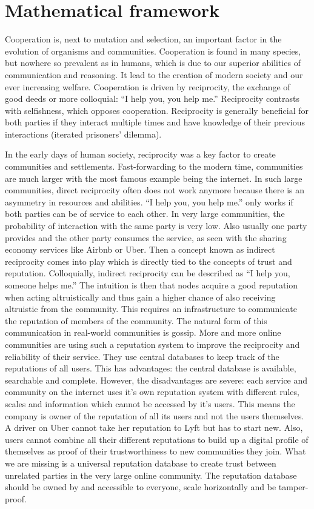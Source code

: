 \chapter{Mathematical framework}
Cooperation is, next to mutation and selection, an important factor in the evolution of organisms and communities. Cooperation is found in many species, but nowhere so prevalent as in humans, which is due to our superior abilities of communication and reasoning. It lead to the creation of modern society and our ever increasing welfare. Cooperation is driven by reciprocity, the exchange of good deeds or more colloquial: “I help you, you help me.” Reciprocity contrasts with selfishness, which opposes cooperation. Reciprocity is generally beneficial for both parties if they interact multiple times and have knowledge of their previous interactions (iterated prisoners’ dilemma). 


In the early days of human society, reciprocity was a key factor to create communities and settlements. Fast-forwarding to the modern time, communities are much larger with the most famous example being the internet. In such large communities, direct reciprocity often does not work anymore because there is an asymmetry in resources and abilities. “I help you, you help me.” only works if both parties can be of service to each other. In very large communities, the probability of interaction with the same party is very low. Also usually one party provides and the other party consumes the service, as seen with the sharing economy services like Airbnb or Uber. Then a concept known as indirect reciprocity comes into play which is directly tied to the concepts of trust and reputation. Colloquially, indirect reciprocity can be described as “I help you, someone helps me.” The intuition is then that nodes acquire a good reputation when acting altruistically and thus gain a higher chance of also receiving altruistic from the community. This requires an infrastructure to communicate the reputation of members of the community. The natural form of this communication in real-world communities is gossip. More and more online communities are using such a reputation system to improve the reciprocity and reliability of their service. They use central databases to keep track of the reputations of all users. This has advantages: the central database is available, searchable and complete. However, the disadvantages are severe: each service and community on the internet uses it’s own reputation system with different rules, scales and information which cannot be accessed by it’s users. This means the company is owner of the reputation of all its users and not the users themselves. A driver on Uber cannot take her reputation to Lyft but has to start new. Also, users cannot combine all their different reputations to build up a digital profile of themselves as proof of their trustworthiness to new communities they join. What we are missing is a universal reputation database to create trust between unrelated parties in the very large online community. The reputation database should be owned by and accessible to everyone, scale horizontally and be tamper-proof.


